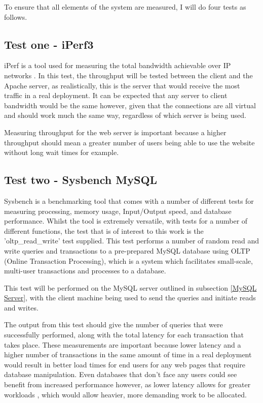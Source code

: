 To ensure that all elements of the system are measured, I will do four tests as follows.

\subsection{Test one - iPerf3}
iPerf is a tool used for measuring the total bandwidth achievable over IP networks \citep{iPerf3}. In this test, the throughput will be tested between the client and the Apache server, as realistically, this is the server that would receive the most traffic in a real deployment. It can be expected that any server to client bandwidth would be the same however, given that the connections are all virtual and should work much the same way, regardless of which server is being used.

Measuring throughput for the web server is important because a higher throughput should mean a greater number of users being able to use the website without long wait times for example.

\subsection{Test two - Sysbench MySQL}
Sysbench is a benchmarking tool that comes with a number of different tests for measuring processing, memory usage, Input/Output speed, and database performance\citep{sysbench}. Whilst the tool is extremely versatile, with tests for a number of different functions, the test that is of interest to this work is the 'oltp\_read\_write' test supplied. This test performs a number of random read and write queries and transactions to a pre-prepared MySQL database using OLTP (Online Transaction Processing), which is a system which facilitates small-scale, multi-user transactions and processes to a database\citep{OLTP}.

This test will be performed on the MySQL server outlined in subsection \ref{MySQL Server}, with the client machine being used to send the queries and initiate reads and writes.

The output from this test should give the number of queries that were successfully performed, along with the total latency for each transaction that takes place. These measurements are important because lower latency and a higher number of transactions in the same amount of time in a real deployment would result in better load times for end users for any web pages that require database manipulation. Even databases that don't face any users could see benefit from increased performance however, as lower latency allows for greater workloads \citep{MySQLlatency}, which would allow heavier, more demanding work to be allocated.

